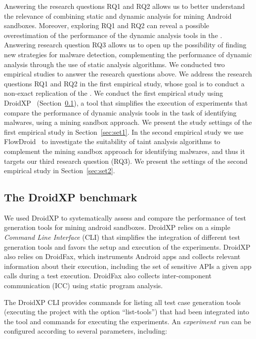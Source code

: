 Answering the research questions RQ1 and RQ2 allows us to better
understand the relevance of combining static
and dynamic analysis for mining Android sandboxes. Moreover,
exploring RQ1 and RQ2 can reveal 
a possible overestimation of the performance of the
dynamic analysis tools in the \blls. Answering research question RQ3
allows us to open up the possibility of finding new strategies for malware detection, complementing the performance of
dynamic analysis through the use of static analysis algorithms.
We conducted two empirical studies to answer the research questions above. We address
the research questions RQ1 and RQ2 in the
first empirical study, whose goal is to conduct a non-exact replication of
the \blls. We conduct the first empirical study using
DroidXP~\cite{DBLP:conf/scam/CostaMCMVBC20} (Section~\ref{sec:droidxp}), a
tool that simplifies the execution of experiments
that compare the performance of dynamic analysis tools
in the task of identifying malwares, using a mining sandbox
approach. We present the study settings of the first
empirical study in Section~\ref{sec:set1}.
In the second empirical study we use
FlowDroid~\cite{DBLP:conf/pldi/ArztRFBBKTOM14} to investigate the 
suitability of taint analysis algorithms to complement the mining sandbox
approach for identifying malwares, and thus it targets our third
research question (RQ3). We present the settings of the second
empirical study in Section~\ref{sec:set2}. 


\subsection{The DroidXP benchmark}\label{sec:droidxp}

We used DroidXP to systematically assess and compare the
performance of test generation tools for mining android sandboxes. DroidXP relies on a
simple \emph{Command Line Interface} (CLI) that simplifies the integration
of different test generation tools and favors the setup and execution 
of the experiments. DroidXP also relies on DroidFax, which instruments
Android apps and collects relevant information about
their execution, including the set of sensitive APIs a given
app calls during a test execution. DroidFax also collects
inter-component communication (ICC) using  static
program analysis.

The DroidXP CLI provides commands for listing all test case
generation tools (executing the project with the option ``list-tools'') that had been
integrated into the tool and commands for executing the experiments. An
\emph{experiment run} can be configured according to several parameters, including:

